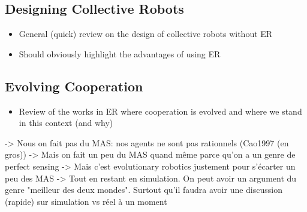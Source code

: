 

  \subsection{Designing Collective Robots}
    \begin{itemize}
      \item{General (quick) review on the design of collective robots without ER}
      \item{Should obviously highlight the advantages of using ER}
    \end{itemize}

  \subsection{Evolving Cooperation}
    \begin{itemize}
      \item{Review of the works in ER where cooperation is evolved and where we stand in this context (and why)}
    \end{itemize}


    -> Nous on fait pas du MAS: nos agents ne sont pas rationnels (Cao1997 (en gros))
          -> Mais on fait un peu du MAS quand même parce qu'on a un genre de perfect sensing
          -> Mais c'est evolutionary robotics justement pour s'écarter un peu des MAS
          -> Tout en restant en simulation. On peut avoir un argument du genre "meilleur des deux mondes". Surtout qu'il faudra avoir une discussion (rapide) sur simulation vs réel à un moment










































